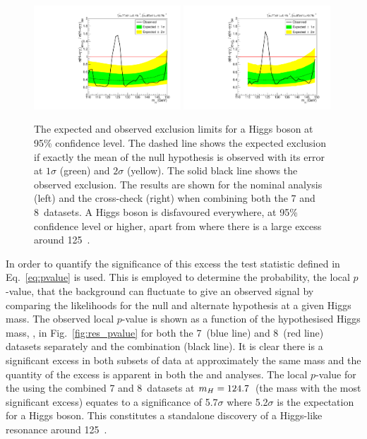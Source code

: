 \begin{figure}
  \includegraphics[width=0.49\textwidth]{results/plots/mva_limit.pdf}
  \includegraphics[width=0.49\textwidth]{results/plots/sideband_limit.pdf}
  \caption[The expected and observed exclusion limits for a \acs{SM} Higgs boson at 95\% confidence level]{The expected and observed exclusion limits for a \SM Higgs boson at 95\% confidence level. The dashed line shows the expected exclusion if exactly the mean of the null hypothesis is observed with its error at $1\sigma$ (green) and $2\sigma$ (yellow). The solid black line shows the observed exclusion. The results are shown for the nominal \MFM analysis (left) and the cross-check \SMVA (right) when combining both the 7 and 8~\TeV datasets. A \SM Higgs boson is disfavoured everywhere, at 95\% confidence level or higher, apart from where there is a large excess around 125~\GeV.}
  \label{fig:res_exclusion}
\end{figure}

In order to quantify the significance of this excess the test statistic defined in Eq.~\ref{eq:pvalue} is used. This is employed to determine the probability, the local $p$-value, that the background can fluctuate to give an observed signal by comparing the likelihoods for the null and alternate hypothesis at a given Higgs mass. The observed local $p$-value is shown as a function of the hypothesised Higgs mass, \mH, in Fig.~\ref{fig:res_pvalue} for both the 7~\TeV (blue line) and 8~\TeV (red line) datasets separately and the combination (black line). It is clear there is a significant excess in both subsets of data at approximately the same mass and the quantity of the excess is apparent in both the \MFM and \SMVA analyses. The local $p$-value for the \MFM using the combined 7 and 8~\TeV datasets at $m_{H}=124.7$~\GeV (the mass with the most significant excess) equates to a significance of 5.7$\sigma$ where 5.2$\sigma$ is the expectation for a \SM Higgs boson. This constitutes a standalone discovery of a Higgs-like resonance around 125~\GeV.

